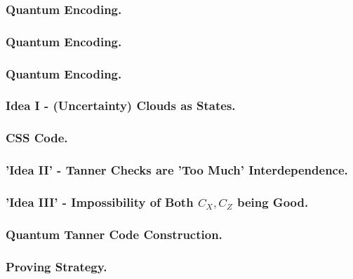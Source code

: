 \documentclass[usenames, aspectratio=169]{beamer}
\theoremstyle{claim}
\theoremstyle{remark}
\begin{document}
 \begin{frame}
   \frametitle{Quantum Encoding.}
\end{frame}
 \begin{frame}
   \frametitle{Quantum Encoding.}
\end{frame}
 \begin{frame}
   \frametitle{Quantum Encoding.}
\end{frame}

\begin{frame}
  \frametitle{ Idea I - (Uncertainty) Clouds as States. }
\end{frame}
\begin{frame}
  \frametitle{ CSS Code.  }
\end{frame}

\begin{frame}
  \frametitle{ 'Idea II' - Tanner Checks are 'Too Much' Interdependence.}
\end{frame}

\begin{frame}
  \frametitle{ 'Idea III' - Impossibility of Both $C_{X},C_{Z}$ being Good.}
\end{frame}

\begin{frame}
  \frametitle{ Quantum Tanner Code Construction.}
\end{frame}

\begin{frame}
  \frametitle{ Proving Strategy. }
\end{frame}

\end{document}
